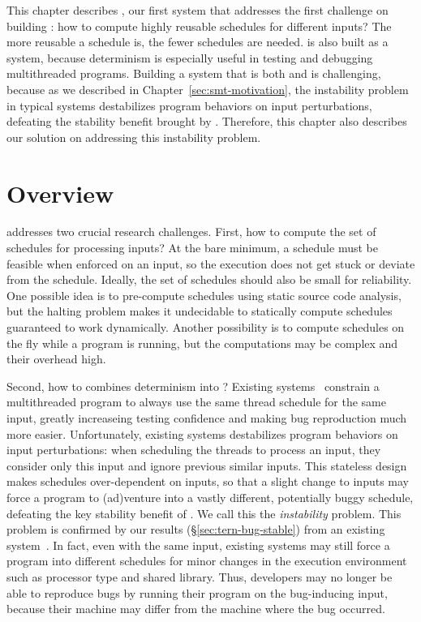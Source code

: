 This chapter describes \tern, our first \smt system that
addresses the first challenge on building \smt: how to compute highly reusable
schedules for different inputs? The more reusable a schedule is, the fewer
schedules are needed. \tern is also built as a \dmt system, because determinism
is especially useful in testing and debugging multithreaded programs. Building a
system that is both \smt and \dmt is challenging, because as we described in
Chapter~\ref{sec:smt-motivation}, the instability problem in typical \dmt
systems destabilizes program behaviors on input perturbations,
defeating the stability benefit brought by \smt. Therefore, this chapter
also describes our solution on addressing this instability problem.

\section{Overview} \label{sec:tern-overview}

\tern addresses two crucial research challenges. First, how to compute the set
of schedules for processing inputs?  At the bare minimum, a schedule must be
feasible when enforced on an input, so the execution does not get stuck or
deviate from the schedule.  Ideally, the set of schedules should also be small
for reliability.  One possible idea is to pre-compute schedules using static
source code analysis, but the halting problem makes it undecidable to
statically compute schedules guaranteed to work dynamically.  Another
possibility is to compute schedules on the fly while a program is running,
but the computations may be complex and their overhead high.

Second, how to combines determinism into \smt? Existing \dmt
systems~\cite{dmp:asplos09,coredet:asplos10,kendo:asplos09} constrain a
multithreaded program to always use the same thread schedule for the same input,
greatly increaseing testing confidence and making bug reproduction much more
easier. Unfortunately, existing \dmt systems destabilizes program behaviors on
input perturbations: when scheduling the threads to process an input, they
consider only this input and ignore previous similar inputs.  This stateless
design makes schedules over-dependent on inputs, so that a slight change to
inputs may force a program to (ad)venture into a vastly different,
potentially buggy schedule, defeating the key stability benefit of \smt.  We
call this the \emph{instability} problem. This problem is confirmed by our
results (\S\ref{sec:tern-bug-stable}) from an existing \dmt
system~\cite{coredet:asplos10}. In fact, even with the same input, existing \dmt
systems may still force a program into different schedules for minor changes in
the execution environment such as processor type and shared library.  Thus,
developers may no longer be able to reproduce bugs by running their
program on the bug-inducing input, because their machine may differ from
the machine where the bug occurred.

